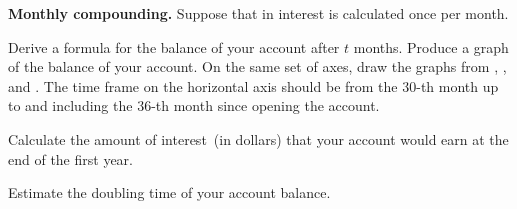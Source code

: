 \documentclass[a4paper,oneside,12pt]{article}
\begin{document}
\begin{exercise}
\textbf{Monthly compounding.}
Suppose that in  interest is calculated
once per month.
\begin{packedenum}
\item\label{subex:savings_monthly_formula}
  Derive a formula for the balance of your account after $t$ months.
  Produce a graph of the balance of your account.  On the same set of
  axes, draw the graphs from
  ,
  ,
  and
  .
  The time frame on the horizontal axis should be from the $30$-th
  month up to and including the $36$-th month since opening the
  account.

\item\label{subex:savings_monthly_interest}
  Calculate the amount of interest~(in dollars) that your account
  would earn at the end of the first year.

\item\label{subex:savings_monthly_doubling_time}
  Estimate the doubling time of your account balance.
\end{packedenum}
\end{exercise}
\end{document}
